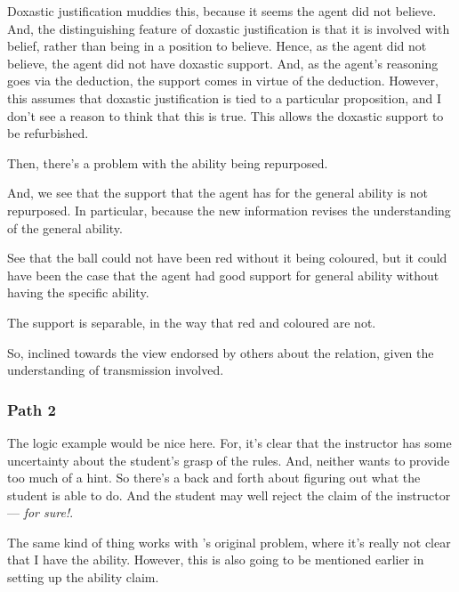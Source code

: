\documentclass[10pt]{article}
\begin{document}
\begin{note}
  Doxastic justification muddies this, because it seems the agent did not believe.
  And, the distinguishing feature of doxastic justification is that it is involved with belief, rather than being in a position to believe.
  Hence, as the agent did not believe, the agent did not have doxastic support.
  And, as the agent's reasoning goes via the deduction, the support comes in virtue of the deduction.
  However, this assumes that doxastic justification is tied to a particular proposition, and I don't see a reason to think that this is true.
  This allows the doxastic support to be refurbished.

  Then, there's a problem with the ability being repurposed.

  And, we see that the support that the agent has for the general ability is not repurposed.
  In particular, because the new information revises the understanding of the general ability.

  See that the ball could not have been red without it being coloured, but it could have been the case that the agent had good support for general ability without having the specific ability.

  The support is separable, in the way that red and coloured are not.

  So, inclined towards the view endorsed by others about the relation, given the understanding of transmission involved.
\end{note}


\subsubsection{Path 2}
\label{sec:path-2}

\begin{note}
  The logic example would be nice here.
  For, it's clear that the instructor has some uncertainty about the student's grasp of the rules.
  And, neither wants to provide too much of a hint.
  So there's a back and forth about figuring out what the student is able to do.
  And the student may well reject the claim of the instructor --- \emph{for sure!}.
\end{note}

\begin{note}
  The same kind of thing works with \cite{Emms:2000aa}'s original problem, where it's really not clear that I have the ability.
  However, this is also going to be mentioned earlier in setting up the ability claim.
\end{note}
\end{document}
